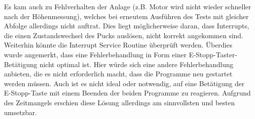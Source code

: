 \documentclass[oneside,a4paper,titlepage]{scrartcl}              %
\begin{document}
Es kam auch zu Fehlverhalten der Anlage (z.B. Motor wird nicht wieder schneller nach der Höhenmessung), welches bei erneutem Ausführen des Tests mit gleicher Abfolge allerdings nicht auftrat. Dies liegt möglicherweise daran, dass Interrupts, die einen Zustandswechsel des Pucks auslösen, nicht korrekt angekommen sind. Weiterhin könnte die Interrupt Service Routine überprüft werden.\newline\newline
Überdies wurde angemerkt, dass eine Fehlerbehandlung in Form einer E-Stopp-Taster-Betätigung nicht optimal ist. Hier würde sich eine andere Fehlerbehandlung anbieten, die es nicht erforderlich macht, dass die Programme neu gestartet werden müssen.\newline
Auch ist es nicht ideal oder notwendig, auf eine Betätigung der E-Stopp-Taste mit einem Beenden der beiden Programme zu reagieren. Aufgrund des Zeitmangels erschien diese Lösung allerdings am sinnvollsten und besten umsetzbar.



\newpage

\end{document}

